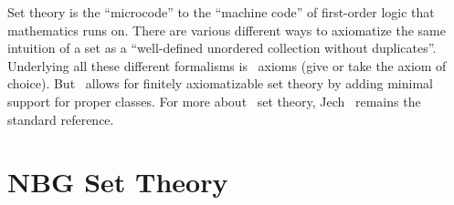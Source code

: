 \begin{node}\label{set-0000}%
Set theory is the ``microcode'' to the ``machine code'' of first-order
logic that mathematics runs on. There are various different ways to
axiomatize the same intuition of a set as a ``well-defined unordered
collection without duplicates''. Underlying all these different
formalisms is \ZFC\ axioms (give or take the axiom of choice). But
\NBG\ allows for finitely axiomatizable set theory by adding minimal
support for proper classes. For more about \ZFC\ set theory,
Jech~\cite{jech2003set} remains the standard reference.
\end{node}

\section{NBG Set Theory}\label{sec:set:nbg}

